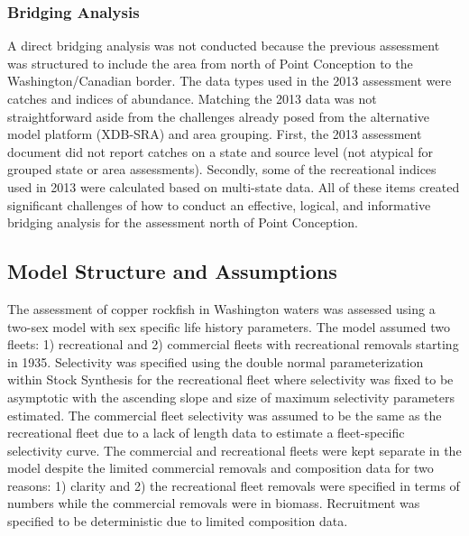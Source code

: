 \documentclass[11pt,
  english,
  a4paper,
]{article}
\begin{document}
\leavevmode\tagmcend\tagstructend\par


\hypertarget{bridging-analysis}{%
\subsubsection{Bridging Analysis}\label{bridging-analysis}}

\leavevmode\tagmcend\tagstructend


A direct bridging analysis was not conducted because the previous assessment was structured to include the area from north of Point Conception to the Washington/Canadian border. The data types used in the 2013 assessment were catches and indices of abundance. Matching the 2013 data was not straightforward aside from the challenges already posed from the alternative model platform (XDB-SRA) and area grouping. First, the 2013 assessment document did not report catches on a state and source level (not atypical for grouped state or area assessments). Secondly, some of the recreational indices used in 2013 were calculated based on multi-state data. All of these items created significant challenges of how to conduct an effective, logical, and informative bridging analysis for the assessment north of Point Conception.

\leavevmode\tagmcend\tagstructend\par


\hypertarget{model-structure-and-assumptions}{%
\subsection{Model Structure and Assumptions}\label{model-structure-and-assumptions}}

\leavevmode\tagmcend\tagstructend


The assessment of copper rockfish in Washington waters was assessed using a two-sex model with sex specific life history parameters. The model assumed two fleets: 1) recreational and 2) commercial fleets with recreational removals starting in 1935. Selectivity was specified using the double normal parameterization within Stock Synthesis for the recreational fleet where selectivity was fixed to be asymptotic with the ascending slope and size of maximum selectivity parameters estimated. The commercial fleet selectivity was assumed to be the same as the recreational fleet due to a lack of length data to estimate a fleet-specific selectivity curve. The commercial and recreational fleets were kept separate in the model despite the limited commercial removals and composition data for two reasons: 1) clarity and 2) the recreational fleet removals were specified in terms of numbers while the commercial removals were in biomass. Recruitment was specified to be deterministic due to limited composition data.
\end{document}
